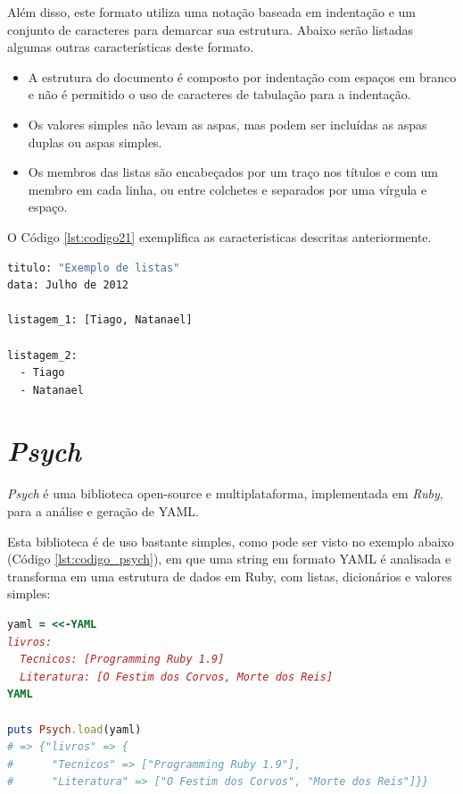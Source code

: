 Além disso, este formato utiliza uma notação baseada em indentação e um conjunto de caracteres para demarcar sua estrutura. Abaixo serão listadas algumas outras características deste formato.

\begin{itemize}
\item A estrutura do documento é composto por indentação com espaços em branco e não é permitido o uso de caracteres de tabulação para a indentação.

\item Os valores simples não levam as aspas, mas podem ser incluídas as aspas duplas ou aspas simples.

\item Os membros das listas são encabeçados por um traço nos títulos e com um membro em cada linha, ou entre colchetes e separados por uma vírgula e espaço.
\end{itemize}

O Código \ref{lst:codigo21} exemplifica as caracteristicas descritas anteriormente.

{\singlespace
\begin{lstlisting}[caption=Estrutura do código \textit{YAML},language=bash,label={lst:codigo21}]
titulo: "Exemplo de listas"
data: Julho de 2012

listagem_1: [Tiago, Natanael]

listagem_2:
  - Tiago
  - Natanael
\end{lstlisting}
}

\section{\textit{Psych}}

\textit{Psych} \cite{PSYCH} é uma biblioteca open-source e multiplataforma, implementada em \textit{Ruby}, para a análise e geração de YAML.

Esta biblioteca é de uso bastante simples, como pode ser visto no exemplo abaixo (Código \ref{lst:codigo_psych}), em que uma string em formato YAML é analisada e transforma em uma estrutura de dados em Ruby, com listas, dicionários e valores simples:

{\singlespace
\begin{lstlisting}[caption=Biblioteca \textit{Psych}, language=Ruby,label={lst:codigo_psych}]
yaml = <<-YAML
livros:
  Tecnicos: [Programming Ruby 1.9]
  Literatura: [O Festim dos Corvos, Morte dos Reis]
YAML

puts Psych.load(yaml)
# => {"livros" => {
#      "Tecnicos" => ["Programming Ruby 1.9"],
#      "Literatura" => ["O Festim dos Corvos", "Morte dos Reis"]}}
\end{lstlisting}
}

